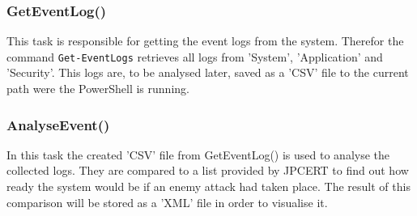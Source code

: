 \subsubsection{GetEventLog()}
This task is responsible for getting the event logs from the system. Therefor the command \lstinline|Get-EventLogs| \cite{Get-EventLogs} retrieves all logs from 'System', 'Application' and 'Security'. This logs are, to be analysed later, saved as a 'CSV' file to the current path were the PowerShell is running.

\subsubsection{AnalyseEvent()}
In this task the created 'CSV' file from GetEventLog() is used to analyse the collected logs. They are compared to a list provided by JPCERT to find out how ready the system would be if an enemy attack had taken place. The result of this comparison will be stored as a 'XML' file in order to visualise it.


